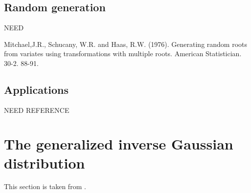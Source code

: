 \subsection{Random generation}
NEED 	

Mitchael,J.R., Schucany, W.R. and Haas, R.W. (1976). Generating
	random roots from variates using transformations with multiple roots.
	American Statistician. 30-2. 88-91.

\subsection{Applications}
NEED REFERENCE

\section{The generalized inverse Gaussian distribution} \label{sec:gig}
This section is taken from \cite{ghyp}.

